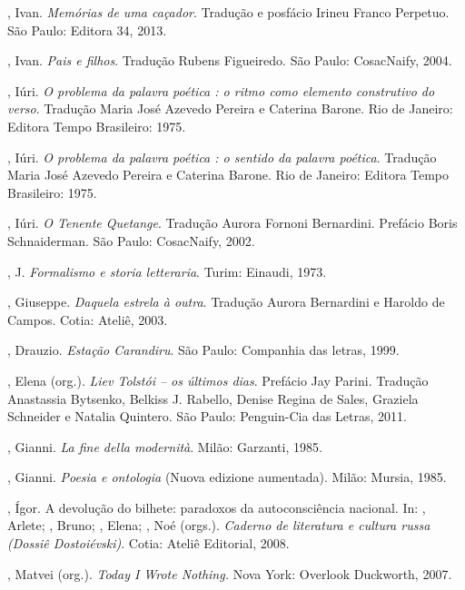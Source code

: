 \begin{Parskip}
{, Ivan. \emph{Memórias de uma caçador}. Tradução e posfácio Irineu Franco Perpetuo. São Paulo: Editora 34, 2013.

, Ivan. \emph{Pais e filhos}. Tradução Rubens Figueiredo. São
Paulo: CosacNaify, 2004.

, Iúri. \emph{O problema da palavra poética : o ritmo como elemento
construtivo do verso}. Tradução Maria José Azevedo Pereira e Caterina Barone. Rio de Janeiro: Editora Tempo Brasileiro: 1975.

, Iúri. \emph{O problema da palavra poética : o sentido da palavra
poética}. Tradução Maria José Azevedo Pereira e Caterina Barone. Rio de Janeiro: Editora Tempo Brasileiro: 1975.

, Iúri. \emph{O Tenente Quetange}. Tradução Aurora Fornoni Bernardini. Prefácio Boris Schnaiderman. São Paulo: CosacNaify, 2002.

, J. \emph{Formalismo e storia letteraria}. Turim: Einaudi, 1973.

, Giuseppe. \emph{Daquela estrela à outra}. Tradução Aurora Bernardini e Haroldo de Campos. Cotia: Ateliê, 2003.

, Drauzio. \emph{Estação Carandiru}. São Paulo: Companhia das letras, 1999.

, Elena (org.). \emph{Liev Tolstói -- os últimos dias}. Prefácio Jay Parini. Tradução
Anastassia Bytsenko, Belkiss J. Rabello, Denise Regina de Sales, Graziela Schneider e Natalia Quintero. São Paulo:
Penguin-Cia das Letras, 2011.

, Gianni. \emph{La fine della modernità}. Milão: Garzanti, 1985.

, Gianni. \emph{Poesia e ontologia} (Nuova edizione aumentada). Milão: Mursia, 1985.

, Ígor. A devolução do bilhete: paradoxos da autoconsciência nacional. In: , Arlete; , Bruno; , Elena; , Noé (orgs.). \emph{Caderno de literatura e cultura russa (Dossiê Dostoiévski)}. Cotia: Ateliê Editorial, 2008.

, Matvei (org.). \emph{Today I Wrote Nothing.} Nova York:
Overlook Duckworth, 2007.
}
\end{Parskip}

\afterpage{\blankpage}